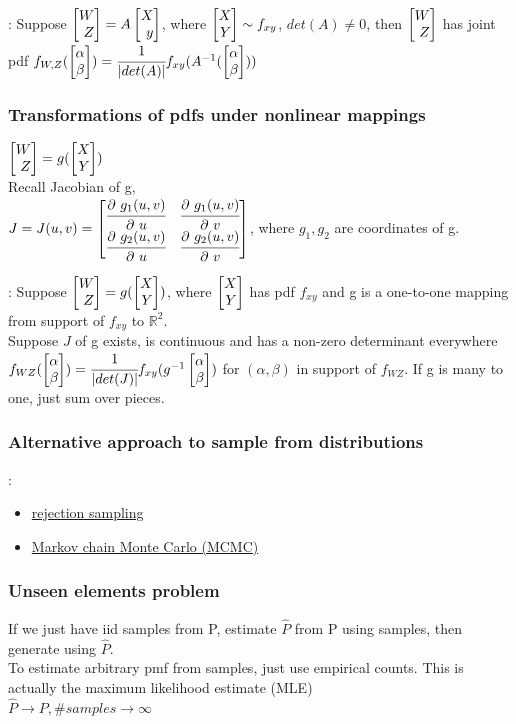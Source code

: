 \documentclass[12pt,a4paper]{article}
\begin{document}
\thm: Suppose $\vecb{W\\Z}=A\vecb{X\\y}$, where $\vecb{X\\Y}\sim f_{xy}$, $det(A)\neq 0$, then $\vecb{W\\Z}$ has joint pdf $f_{W,Z}(\vecb{\alpha\\\beta})=\cfrac{1}{|det(A)|}f_{xy}(A^{-1}(\vecb{\alpha\\\beta}))$

\subsubsection{Transformations of pdfs under nonlinear mappings}
$\vecb{W\\Z}=g(\vecb{X\\Y})$\\
Recall Jacobian of g, \\
$J=J(u,v)=\vecb{\pfrac{g_1(u,v)}{u} & \pfrac{g_1(u,v)}{v}\\
\pfrac{g_2(u,v)}{u} & \pfrac{g_2(u,v)}{v}}$, where $g_1, g_2$ are coordinates of g.

\thm: Suppose $\vecb{W\\Z}=g(\vecb{X\\Y})$, where $\vecb{X\\Y}$ has pdf $f_{xy}$ and g is a one-to-one mapping from support of $f_{xy}$ to $\mathbb{R}^2$. \\
Suppose $J$ of g exists, is continuous and has a non-zero determinant everywhere\\
$f_{WZ}(\vecab)=\cfrac{1}{|det(J)|}f_{xy}(g^{-1}\vecab)$ for $(\alpha,\beta)$ in support of $f_{WZ}$. If g is many to one, just sum over pieces. 

\subsubsection{Alternative approach to sample from distributions}:
\begin{itemize}
\item \href{https://bookdown.org/rdpeng/advstatcomp/rejection-sampling.html}{rejection sampling}
\item \href{https://machinelearningmastery.com/markov-chain-monte-carlo-for-probability/}{Markov chain Monte Carlo (MCMC)}
\end{itemize}

\subsubsection{Unseen elements problem}
If we just have iid samples from P, estimate $\hat{P}$ from P using samples, then generate using $\hat{P}$.\\
To estimate arbitrary pmf from samples, just use empirical counts. This is actually the maximum likelihood estimate (MLE) \\
$\hat{P}\rightarrow P, \#samples\rightarrow \infty$
\end{document}
